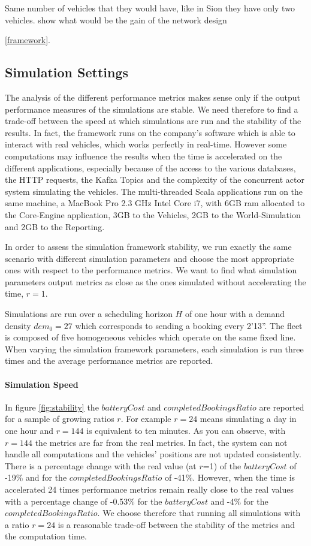 \documentclass[12pt,a4paper]{article}
\begin{document}
Same number of vehicles that they would have, like in Sion they have only two vehicles.
show what would be the gain of the network design

\ref{framework}.

\subsection{Simulation Settings}\label{settings}
The analysis of the different performance metrics makes sense only if the output performance measures of the simulations are stable. We need therefore to find a trade-off between the speed at which simulations are run and the stability of the results. In fact, the framework runs on the company's software which is able to interact with real vehicles, which works perfectly in real-time. However some computations may influence the results when the time is accelerated on the different applications, especially because of the access to the various databases, the HTTP requests, the Kafka Topics and the complexity of the concurrent actor system simulating the vehicles. The multi-threaded Scala applications run on the same machine, a MacBook Pro 2.3 GHz Intel Core i7, with 6GB ram allocated to the Core-Engine application, 3GB to the Vehicles, 2GB to the World-Simulation and 2GB to the Reporting. 

In order to assess the simulation framework stability, we run exactly the same scenario with different simulation parameters and choose the most appropriate ones with respect to the performance metrics. We want to find what simulation parameters output metrics as close as the ones simulated without accelerating the time, $r=1$.

Simulations are run over a scheduling horizon $H$ of one hour with a demand density $dem_{0} = 27$ which corresponds to sending a booking every 2'13''. The fleet is composed of five homogeneous vehicles which operate on the same fixed line. When varying the simulation framework parameters, each simulation is run three times and the average performance metrics are reported. 

\paragraph{Simulation Speed} In figure \ref{fig:stability} the $batteryCost$ and $completedBookingsRatio$ are reported for a sample of growing ratios $r$. For example $r = 24$ means simulating a day in one hour and $r=144$ is equivalent to ten minutes. As you can observe, with $r = 144$ the metrics are far from the real metrics. In fact, the system can not handle all computations and the vehicles' positions are not updated consistently. There is a percentage change with the real value (at $r$=1) of the $batteryCost$ of -19\% and for the $completedBookingsRatio$ of -41\%. However, when the time is accelerated 24 times performance metrics remain really close to the real values with a percentage change of -0.53\% for the $batteryCost$ and -4\% for the $completedBookingsRatio$. We choose therefore that running all simulations with a ratio $r=24$ is a reasonable trade-off between the stability of the metrics and the computation time.
\end{document}
